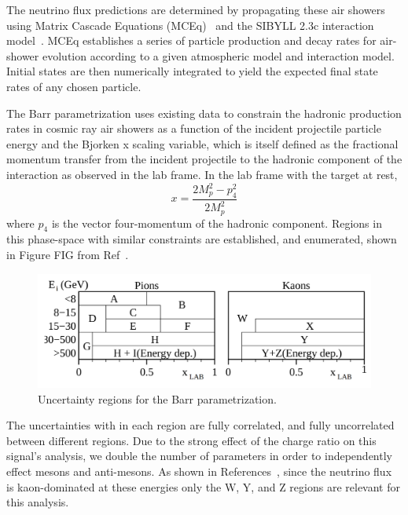 \documentclass[main.tex]{subfiles}
\begin{document}
The neutrino flux predictions are determined by propagating these air showers using Matrix Cascade Equations (MCEq)~\cite{fedynitch2015calculation} and the SIBYLL 2.3c interaction model~\cite{Riehn:2017mfm}. 
MCEq establishes a series of particle production and decay rates for air-shower evolution according to a given atmospheric model and interaction model. 
Initial states are then numerically integrated to yield the expected final state rates of any chosen particle. 

The Barr parametrization uses existing data to constrain the hadronic production rates in cosmic ray air showers as a function of the incident projectile particle energy and the Bjorken x scaling variable, which is itself defined as the fractional momentum transfer from the incident projectile to the hadronic component of the interaction as observed in the lab frame. 
In the lab frame with the target at rest, 
\begin{equation}
    x = \dfrac{ 2M_{p}^{2} - p_{4}^{2}}{2M_{p}^{2}}
\end{equation}
where $p_{4}$ is the vector four-momentum of the hadronic component. 
Regions in this phase-space with similar constraints are established, and enumerated, shown in Figure FIG from Ref~\cite{PhysRevD.74.094009}. 
\begin{figure}
    \centering
    \includegraphics[width=0.7\linewidth]{./figures/barr_letters.png}
    \caption{Uncertainty regions for the Barr parametrization.}
\end{figure}
The uncertainties with in each region are fully correlated, and fully uncorrelated between different regions.
Due to the strong effect of the charge ratio on this signal's analysis, we double the number of parameters in order to independently effect mesons and anti-mesons. 
As shown in References~\cite{Aartsen_2020, Aartsen_2020_prd, axani2020sterile}, since the neutrino flux is kaon-dominated at these energies only the W, Y, and Z regions are relevant for this analysis. 
\end{document}
